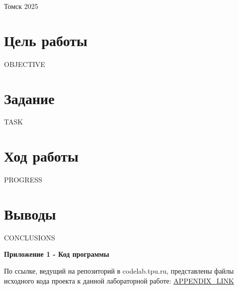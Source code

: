 \documentclass[a4paper,12pt]{article}
\begin{document}
\vspace{4.4cm}

\begin{center}
    Томск 2025
\end{center}

\newpage
\pagestyle{fancy}
\fancyhf{}
\fancyfoot[R]{\thepage}

\section*{Цель работы}
OBJECTIVE

\section*{Задание}
TASK

\section*{Ход работы}
PROGRESS

\newpage

\section*{Выводы}
CONCLUSIONS

\newpage

\begin{flushright}
\textbf{Приложение 1 - Код программы}
\end{flushright}
По ссылке, ведущий на репозиторий в codelab.tpu.ru, представлены файлы исходного кода проекта к данной лабораторной работе: \href{APPENDIX_LINK}{APPENDIX_LINK}
\end{document}
